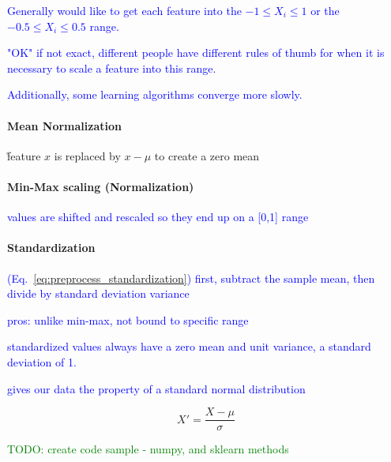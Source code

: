 \textcolor{blue}{Generally would like to get each feature into the $-1 \le X_i \le 1$ or the $-0.5 \le X_i \le 0.5$ range.}

\textcolor{blue}{"OK" if not exact, different people have different rules of thumb for when it is necessary to scale a feature into this range.}

\textcolor{blue}{Additionally, some learning algorithms converge more slowly.}





\paragraph{Mean Normalization}

\r{feature $x$ is replaced by $x - \mu$ to create a zero mean}


\paragraph{Min-Max scaling (Normalization)}

\textcolor{blue}{values are shifted and rescaled so they end up on a [0,1] range}

\paragraph{Standardization}

\textcolor{blue}{(Eq.~\ref{eq:preprocess_standardization}) first, subtract the sample mean, then divide by standard deviation variance}

\textcolor{blue}{pros: unlike min-max, not bound to specific range}

\textcolor{blue}{standardized values always have a zero mean and unit variance, a standard deviation of 1.}

\textcolor{blue}{gives our data the property of a standard normal distribution}

\begin{equation}
{X' = \frac{X - \mu}{\sigma}}
\label{eq:preprocess_standardization}
\end{equation}

\textcolor{green}{TODO: create code sample - numpy, and sklearn methods}

